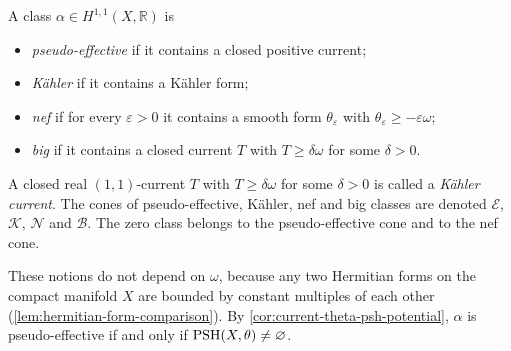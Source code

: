 \begin{definition}\label{def:cohomology-positivity-cones}
A class $\alpha\in H^{1,1}(X,\mathbb R)$ is
\begin{itemize}
\item \emph{pseudo-effective} if it contains a closed positive current;
\item \emph{K\"ahler} if it contains a K\"ahler form;
\item \emph{nef} if for every $\varepsilon>0$ it contains a smooth form $\theta_\varepsilon$ with $\theta_\varepsilon\geq-\varepsilon\omega$;
\item \emph{big} if it contains a closed current $T$ with $T\geq\delta\omega$ for some $\delta>0$.
\end{itemize}
A closed real $(1,1)$-current $T$ with $T\geq\delta\omega$ for some $\delta>0$ is called a \emph{K\"ahler current}. The cones of pseudo-effective, K\"ahler, nef and big classes are denoted $\mathcal E$, $\mathcal K$, $\mathcal N$ and $\mathcal B$. The zero class belongs to the pseudo-effective cone and to the nef cone.
\end{definition}
These notions do not depend on $\omega$, because any two Hermitian forms on the compact manifold $X$ are bounded by constant multiples of each other (\cref{lem:hermitian-form-comparison}). By \cref{cor:current-theta-psh-potential}, $\alpha$ is pseudo-effective if and only if $\mathrm{PSH}(X,\theta)\ne\varnothing$.

